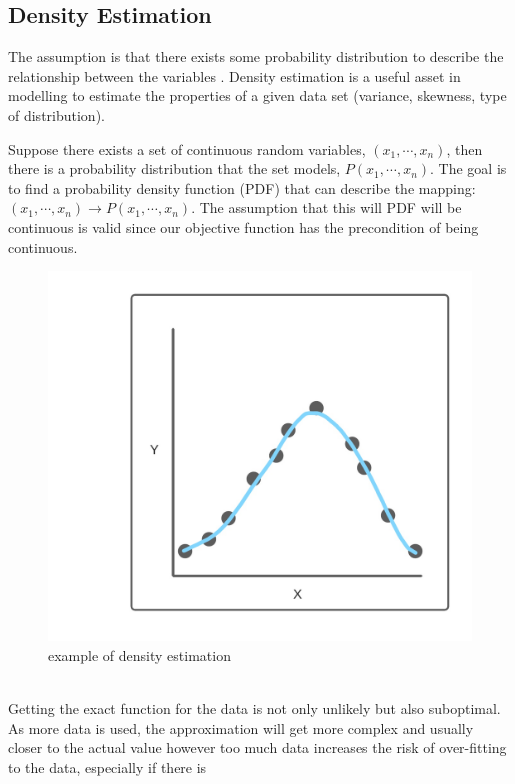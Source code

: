 \documentclass[10pt,a4paper]{report}
\begin{document}
				\subsection{Density Estimation}
					The assumption is that there exists some probability distribution to describe the relationship between the variables \autocite{sheather2004density}.
					Density estimation is a useful asset in modelling to estimate the properties of a given data set (variance, skewness, type of distribution). \par
					Suppose there exists a set of continuous random variables, $(x_1,\cdots,x_n)$, then there is a
					probability distribution that the set models, $P(x_1,\cdots,x_n)$. The goal is to find a probability density function (PDF)
					that can describe the mapping: $(x_1,\cdots,x_n) \to P(x_1,\cdots,x_n)$. The assumption that this will PDF will be continuous is valid
					since our objective function has the precondition of being continuous.
					\begin{figure}[h]
						\centering
						\includegraphics[scale=0.2]{density-estimation-diagram.jpg}
						\caption{example of density estimation}
						\label{fig:density-estimation}
					\end{figure} \\
					Getting the exact function for the data is not only unlikely but also suboptimal. As more data is used, the approximation will
					get more complex and usually closer to the actual value however too much data increases the risk of over-fitting to the data, especially if there is
\end{document}
